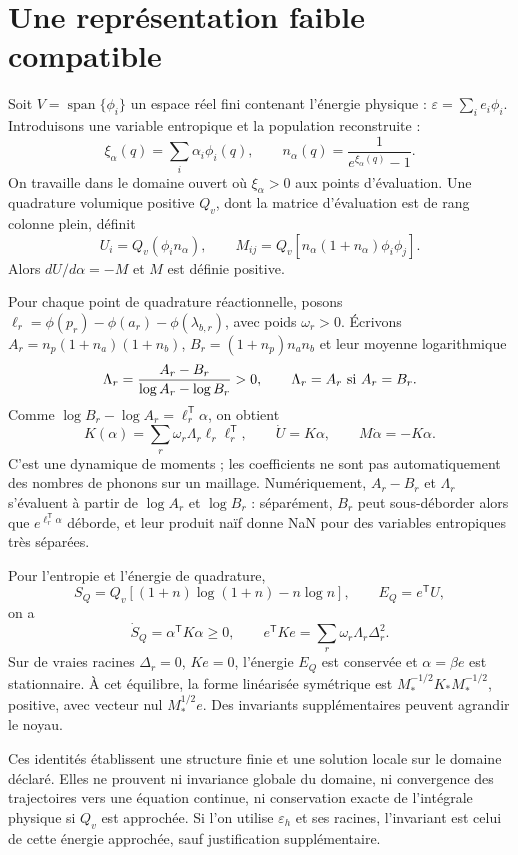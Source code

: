 \documentclass[11pt,a4paper]{article}
\begin{document}
\section{Une représentation faible compatible}
Soit $V=\operatorname{span}\{\phi_i\}$ un espace réel fini contenant
l'énergie physique : $\varepsilon=\sum_i e_i\phi_i$.
Introduisons une variable entropique et la population reconstruite :
\[
 \xi_\alpha(q)=\sum_i\alpha_i\phi_i(q),\qquad
 n_\alpha(q)=\frac{1}{e^{\xi_\alpha(q)}-1}.
\]
On travaille dans le domaine ouvert où $\xi_\alpha>0$ aux points
d'évaluation. Une quadrature volumique positive $Q_v$, dont la matrice
d'évaluation est de rang colonne plein, définit
\[
 U_i=Q_v(\phi_i n_\alpha),\qquad
 M_{ij}=Q_v[n_\alpha(1+n_\alpha)\phi_i\phi_j].
\]
Alors $dU/d\alpha=-M$ et $M$ est définie positive.

Pour chaque point de quadrature réactionnelle, posons
$\ell_r=\phi(p_r)-\phi(a_r)-\phi(\lambda_{b,r})$, avec poids $\omega_r>0$.
Écrivons $A_r=n_p(1+n_a)(1+n_b)$,
$B_r=(1+n_p)n_an_b$ et leur moyenne logarithmique
\[
 \Lambda_r=\frac{A_r-B_r}{\log A_r-\log B_r}>0,
 \qquad \Lambda_r=A_r\ \hbox{si }A_r=B_r.
\]
Comme $\log B_r-\log A_r=\ell_r^{\mathsf T}\alpha$, on obtient
\[
 K(\alpha)=\sum_r\omega_r\Lambda_r \ell_r\ell_r^{\mathsf T},
 \qquad \dot U=K\alpha,\qquad M\dot\alpha=-K\alpha.
\]
C'est une dynamique de moments ; les coefficients ne sont pas
automatiquement des nombres de phonons sur un maillage.
Numériquement, $A_r-B_r$ et $\Lambda_r$ s'évaluent à partir de
$\log A_r$ et $\log B_r$ : séparément, $B_r$ peut sous-déborder alors que
$e^{\ell_r^{\mathsf T}\alpha}$ déborde, et leur produit naïf donne NaN
pour des variables entropiques très séparées.

Pour l'entropie et l'énergie de quadrature,
\[
 S_Q=Q_v[(1+n)\log(1+n)-n\log n],\qquad E_Q=e^{\mathsf T}U,
\]
on a
\[
 \dot S_Q=\alpha^{\mathsf T}K\alpha\ge0,\qquad
 e^{\mathsf T}Ke=\sum_r\omega_r\Lambda_r\Delta_r^2.
\]
Sur de vraies racines $\Delta_r=0$, $Ke=0$, l'énergie $E_Q$
est conservée et $\alpha=\beta e$ est stationnaire.
À cet équilibre, la forme linéarisée symétrique est
$M_*^{-1/2}K_*M_*^{-1/2}$, positive, avec vecteur nul
$M_*^{1/2}e$.
Des invariants supplémentaires peuvent agrandir le noyau.

Ces identités établissent une structure finie et une solution locale
sur le domaine déclaré. Elles ne prouvent ni invariance globale du
domaine, ni convergence des trajectoires vers une équation continue,
ni conservation exacte de l'intégrale physique si $Q_v$ est approchée.
Si l'on utilise $\varepsilon_h$ et ses racines, l'invariant est celui
de cette énergie approchée, sauf justification supplémentaire.
\end{document}
